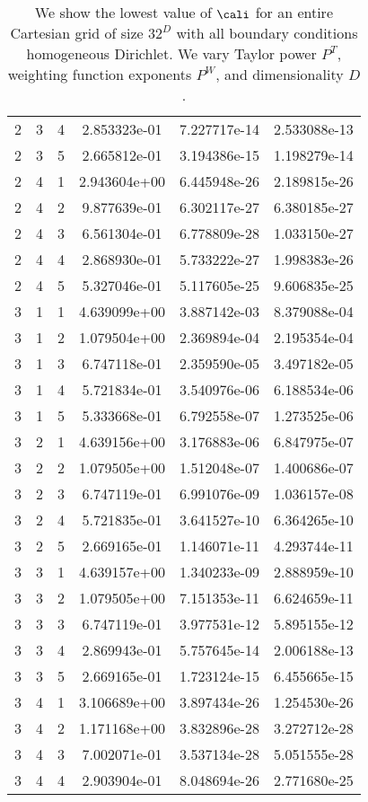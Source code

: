 \documentclass{article}
\begin{document}
{\begin{small}
\begin{table}
\begin{center}
\begin{tabular}{|ccc|ccc|}
2 & 3 & 4 &  2.853323e-01 & 7.227717e-14 & 2.533088e-13 \\ 
2 & 3 & 5 &  2.665812e-01 & 3.194386e-15 & 1.198279e-14 \\ 
2 & 4 & 1 &  2.943604e+00 & 6.445948e-26 & 2.189815e-26 \\ 
2 & 4 & 2 &  9.877639e-01 & 6.302117e-27 & 6.380185e-27 \\ 
2 & 4 & 3 &  6.561304e-01 & 6.778809e-28 & 1.033150e-27 \\ 
2 & 4 & 4 &  2.868930e-01 & 5.733222e-27 & 1.998383e-26 \\ 
2 & 4 & 5 &  5.327046e-01 & 5.117605e-25 & 9.606835e-25 \\
\hline
3 & 1 & 1 & 4.639099e+00 & 3.887142e-03 & 8.379088e-04 \\ 
3 & 1 & 2 & 1.079504e+00 & 2.369894e-04 & 2.195354e-04 \\ 
3 & 1 & 3 & 6.747118e-01 & 2.359590e-05 & 3.497182e-05 \\ 
3 & 1 & 4 & 5.721834e-01 & 3.540976e-06 & 6.188534e-06 \\ 
3 & 1 & 5 & 5.333668e-01 & 6.792558e-07 & 1.273525e-06 \\ 
3 & 2 & 1 & 4.639156e+00 & 3.176883e-06 & 6.847975e-07 \\ 
3 & 2 & 2 & 1.079505e+00 & 1.512048e-07 & 1.400686e-07 \\ 
3 & 2 & 3 & 6.747119e-01 & 6.991076e-09 & 1.036157e-08 \\ 
3 & 2 & 4 & 5.721835e-01 & 3.641527e-10 & 6.364265e-10 \\ 
3 & 2 & 5 & 2.669165e-01 & 1.146071e-11 & 4.293744e-11 \\ 
3 & 3 & 1 & 4.639157e+00 & 1.340233e-09 & 2.888959e-10 \\ 
3 & 3 & 2 & 1.079505e+00 & 7.151353e-11 & 6.624659e-11 \\ 
3 & 3 & 3 & 6.747119e-01 & 3.977531e-12 & 5.895155e-12 \\ 
3 & 3 & 4 & 2.869943e-01 & 5.757645e-14 & 2.006188e-13 \\ 
3 & 3 & 5 & 2.669165e-01 & 1.723124e-15 & 6.455665e-15 \\ 
3 & 4 & 1 & 3.106689e+00 & 3.897434e-26 & 1.254530e-26 \\ 
3 & 4 & 2 & 1.171168e+00 & 3.832896e-28 & 3.272712e-28 \\ 
3 & 4 & 3 & 7.002071e-01 & 3.537134e-28 & 5.051555e-28 \\ 
3 & 4 & 4 & 2.903904e-01 & 8.048694e-26 & 2.771680e-25 \\ 
\hline
\end{tabular}
\end{center}
\label{fig::allRegDiri}
\caption
    {
      We show the lowest value of
      $\cali$ for an entire Cartesian grid of size $32^D$ with all
      boundary conditions homogeneous Dirichlet.
      We vary Taylor power $P^T$, weighting
      function exponents $P^W$, and dimensionality $D$.
    }
\end{table}
\end{small}

}
\end{document}
